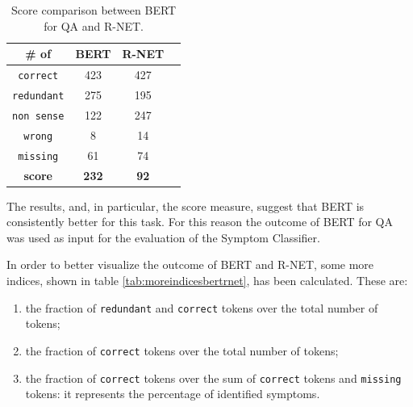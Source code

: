 \begin{center}
  \begin{table}[h]
  \centering
     \begin{tabular}{| c | c | c | c |} 
     \hline
     \# of & BERT & R-NET \\ [0.5ex] 
     \hline\hline
     \rowcolor{green}
     \texttt{correct} & 423 & 427 \\ 
     \hline
     \rowcolor{lightgreen}
     \texttt{redundant} & 275 & 195 \\
     \hline
     \rowcolor{red}
     \texttt{non sense} & 122 & 247 \\
     \hline
     \rowcolor{red}
     \texttt{wrong} & 8 & 14 \\
     \hline
     \rowcolor{red}
     \texttt{missing} & 61 & 74 \\
     \hline
     \textbf{score} & \textbf{232} & \textbf{92} \\ 
     \hline
    \end{tabular}
 \caption{\label{tab:bertrnet} Score comparison between BERT for QA and R-NET.}
 \end{table}
\end{center}

The results, and, in particular, the score measure, suggest that BERT is consistently better for this task. For this reason the outcome of BERT for QA was used as input for the evaluation of the Symptom Classifier.

In order to better visualize the outcome of BERT and R-NET, some more indices, shown in table \ref{tab:moreindicesbertrnet}, has been calculated. 
\newpage
These are:
\begin{enumerate}
  \item the fraction of \texttt{redundant} and \texttt{correct} tokens over the total number of tokens;
  \item the fraction of \texttt{correct} tokens over the total number of tokens;
  \item the fraction of \texttt{correct} tokens over the sum of \texttt{correct} tokens and \texttt{missing} tokens: it represents the percentage of identified symptoms.
\end{enumerate}

